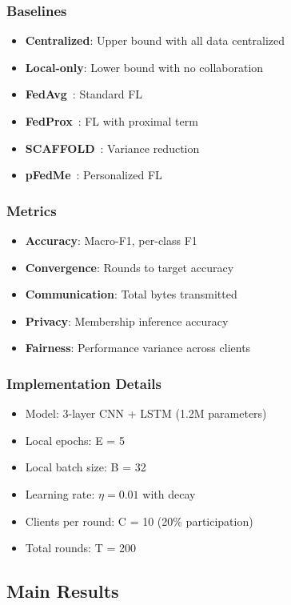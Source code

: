 \documentclass[journal]{IEEEtran}
\begin{document}
\subsubsection{Baselines}
\begin{itemize}
\item \textbf{Centralized}: Upper bound with all data centralized
\item \textbf{Local-only}: Lower bound with no collaboration
\item \textbf{FedAvg}~\cite{mcmahan2017fedavg}: Standard FL
\item \textbf{FedProx}~\cite{li2020fedprox}: FL with proximal term
\item \textbf{SCAFFOLD}~\cite{karimireddy2020scaffold}: Variance reduction
\item \textbf{pFedMe}~\cite{dinh2020pfedme}: Personalized FL
\end{itemize}

\subsubsection{Metrics}
\begin{itemize}
\item \textbf{Accuracy}: Macro-F1, per-class F1
\item \textbf{Convergence}: Rounds to target accuracy
\item \textbf{Communication}: Total bytes transmitted
\item \textbf{Privacy}: Membership inference accuracy
\item \textbf{Fairness}: Performance variance across clients
\end{itemize}

\subsubsection{Implementation Details}
\begin{itemize}
\item Model: 3-layer CNN + LSTM (1.2M parameters)
\item Local epochs: E = 5
\item Local batch size: B = 32
\item Learning rate: $\eta = 0.01$ with decay
\item Clients per round: C = 10 (20\% participation)
\item Total rounds: T = 200
\end{itemize}

\subsection{Main Results}
\end{document}
